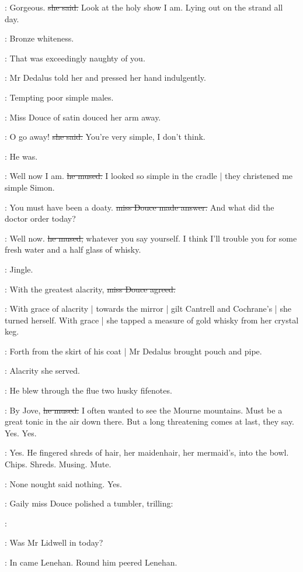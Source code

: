 \MissD:
Gorgeous.
\sout{she said.}
Look at the holy show I am.
Lying out on the strand
all day.

:
Bronze whiteness.

\simon:
That was exceedingly naughty of you.

:
Mr Dedalus told her and pressed her hand indulgently.

\simon:
Tempting poor simple males.

:
Miss Douce of satin douced her arm away.

\MissD:
O go away!
\sout{she said.}
You're very simple,
I don't think.

:
He was.

\simon:
Well now I am.
\sout{he mused.}
I looked so simple in the cradle |
they christened me simple Simon.

\MissD:
You must have been a doaty.
\sout{miss Douce made answer.}
And what did the doctor order today?

\simon:
Well now.
\sout{he mused,}
whatever you say yourself.
I think I'll trouble you
for some fresh water
and a half glass of whisky.

:
Jingle.

\MissD:
With the greatest alacrity,
\sout{miss Douce agreed.}

:
With grace of alacrity |
towards the mirror |
gilt Cantrell and Cochrane's |
she turned herself.
With grace |
she tapped a measure of gold whisky
from her crystal keg.

:
Forth from the skirt of his coat |
Mr Dedalus brought pouch and pipe.

:
Alacrity she served.

:
He blew through the flue two husky fifenotes.

\simon:
By Jove,
\sout{he mused.}
I often wanted to see the Mourne mountains.
Must be a great tonic in the air down there.
But a long threatening comes at last,
they say.
Yes.
Yes.

:
Yes.
He fingered shreds of hair,
her maidenhair,
her mermaid's,
into the bowl.
Chips.
Shreds.
Musing.
Mute.

:
None nought said nothing.
Yes.

:
Gaily miss Douce polished a tumbler,
trilling:

\MissD:

\lenehan:
Was Mr Lidwell in today?

:
In came Lenehan.
Round him peered Lenehan.

